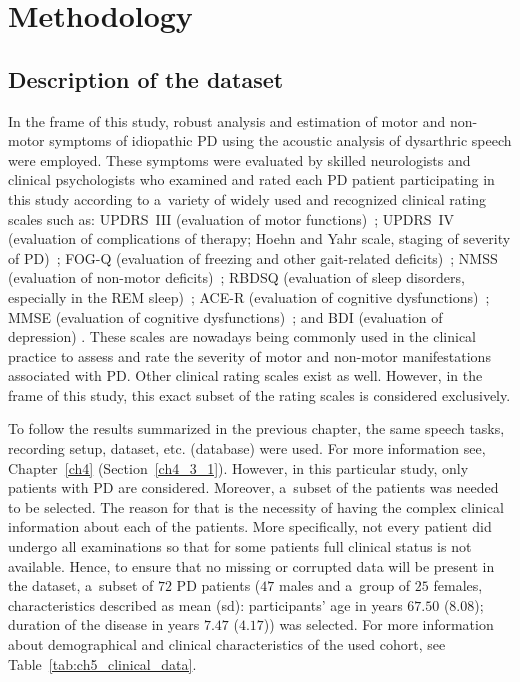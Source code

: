 \section{Methodology}
\label{ch5_3}

\subsection{Description of the dataset}
\label{ch5_3_1}

In the frame of this study, robust analysis and estimation of motor and non-motor symptoms of idiopathic PD using the acoustic analysis of dysarthric speech were employed. These symptoms were evaluated by skilled neurologists and clinical psychologists who examined and rated each PD patient participating in this study according to a~variety of widely used and recognized clinical rating scales such as: UPDRS~III (evaluation of motor functions)~\cite{Fahn1987}; UPDRS~IV (evaluation of complications of therapy; Hoehn and Yahr scale, staging of severity of PD)~\cite{Fahn1987}; FOG-Q (evaluation of freezing and other gait-related deficits)~\cite{Giladi2000}; NMSS (evaluation of non-motor deficits)~\cite{Chaudhuri2007}; RBDSQ (evaluation of sleep disorders, especially in the REM sleep)~\cite{Stiasny2007}; ACE-R (evaluation of cognitive dysfunctions)~\cite{Larner2007}; MMSE (evaluation of cognitive dysfunctions)~\cite{Folstein1975}; and BDI (evaluation of depression) \cite{Beck2000, Beck1961}. These scales are nowadays being commonly used in the clinical practice to assess and rate the severity of motor and non-motor manifestations associated with PD. Other clinical rating scales exist as well. However, in the frame of this study, this exact subset of the rating scales is considered exclusively.

To follow the results summarized in the previous chapter, the same speech tasks, recording setup, dataset, etc. (database) were used. For more information see, Chapter~\ref{ch4} (Section~\ref{ch4_3_1}). However, in this particular study, only patients with PD are considered. Moreover, a~subset of the patients was needed to be selected. The reason for that is the necessity of having the complex clinical information about each of the patients. More specifically, not every patient did undergo all examinations so that for some patients full clinical status is not available. Hence, to ensure that no missing or corrupted data will be present in the dataset, a~subset of $72$ PD patients ($47$ males and a~group of $25$ females, characteristics described as mean (sd): participants' age in years $67.50$ ($8.08$); duration of the disease in years $7.47$ ($4.17$)) was selected. For more information about demographical and clinical characteristics of the used cohort, see Table~\ref{tab:ch5_clinical_data}.

